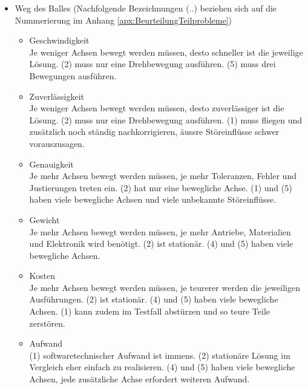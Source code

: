 \begin{itemize}
			\item Weg des Balles (Nachfolgende Bezeichnungen (..) beziehen sich auf die Nummerierung im Anhang \ref{apx:BeurteilungTeilprobleme})			
				\begin{itemize}
					\item Geschwindigkeit\\
					Je weniger Achsen bewegt werden müssen, desto schneller ist die jeweilige Lösung. (2) muss nur eine Drehbewegung ausführen. (5) muss drei Bewegungen ausführen.
					\item Zuverlässigkeit\\
					Je weniger Achsen bewegt werden müssen, desto zuverlässiger ist die Lösung. (2) muss nur eine Drehbewegung ausführen. (1) muss fliegen und zusätzlich noch ständig nachkorrigieren, äussre Störeinflüsse schwer vorauszusagen.
					\item Genauigkeit\\
					Je mehr Achsen bewegt werden müssen, je mehr Toleranzen, Fehler und Justierungen treten ein. (2) hat nur eine bewegliche Achse. (1) und (5) haben viele bewegliche Achsen und viele unbekannte Störeinflüsse.
					\item Gewicht\\
					Je mehr Achsen bewegt werden müssen, je mehr Antriebe, Materialien und Elektronik wird benötigt. (2) ist stationär. (4) und (5) haben viele bewegliche Achsen. 
					\item Kosten\\
					Je mehr Achsen bewegt werden müssen, je teurerer werden die jeweiligen Ausführungen. (2) ist stationär. (4) und (5) haben viele bewegliche Achsen. (1) kann zudem im Testfall abstürzen und so teure Teile zerstören.
					\item Aufwand\\
					(1) softwaretechnischer Aufwand ist immens. (2) stationäre Lösung im Vergleich eher einfach zu realisieren. (4) und (5) haben viele bewegliche Achsen, jede zusätzliche Achse erfordert weiteren Aufwand.	
				\end{itemize}
		\end{itemize}

